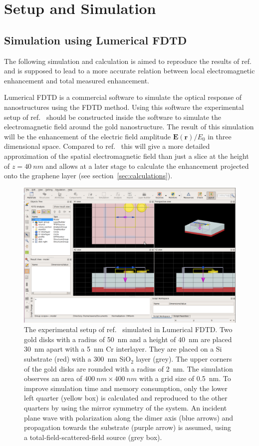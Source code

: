 \newpage
\section{Setup and Simulation}
\label{sec:simulation}
\subsection{Simulation using Lumerical FDTD}

The following simulation and calculation is aimed to reproduce the results of ref.~\cite{heeg} and is supposed to lead to a more accurate relation between local electromagnetic enhancement and total measured enhancement.

Lumerical FDTD is a commercial software to simulate the optical response of nanostructures using the FDTD method. Using this software the experimental setup of ref.~\cite{heeg} should be constructed inside the software to simulate the electromagnetic field around the gold nanostructure. The result of this simulation will be the enhancement of the electric field amplitude $\mathbf{E}(\mathbf{r})/E_0$ in three dimensional space. Compared to ref.~\cite{heeg} this will give a more detailed approximation of the spatial electromagnetic field than just a slice at the height of $z=\SI{40}{nm}$ and allows at a later stage to calculate the enhancement projected onto the graphene layer (see section~\ref{sec:calculations}).

\begin{figure}[!h]
  \includegraphics[width=\textwidth]{./images/lumerical.png}
  \caption{The experimental setup of ref.~\cite{heeg} simulated in Lumerical FDTD. Two gold disks with a radius of \SI{50}{nm} and a height of \SI{40}{nm} are placed \SI{30}{nm} apart with a \SI{5}{nm} Cr interlayer. They are placed on a Si substrate (red) with a \SI{300}{nm} SiO$_2$ layer (grey). The upper corners of the gold disks are rounded with a radius of \SI{2}{nm}. The simulation observes an area of $\SI{400}{nm}\times\SI{400}{nm}$ with a grid size of \SI{0.5}{nm}. To improve simulation time and memory consumption, only the lower left quarter (yellow box) is calculated and reproduced to the other quarters by using the mirror symmetry of the system. An incident plane wave with polarization along the dimer axis (blue arrows) and propagation towards the substrate (purple arrow) is assumed, using a total-field-scattered-field source (grey box).}
  \label{fig:lumerical}
\end{figure}

